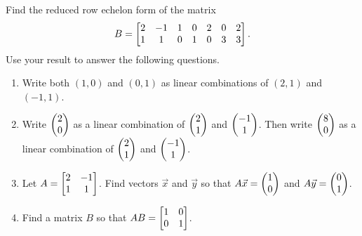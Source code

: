 \begin{problem}
Find the reduced row echelon form of the matrix
$$
B = 
\begin{bmatrix}
\nvec{2\\1}&
\nvec{-1\\1}&
\nvec{1\\0}&
\nvec{0\\1}&
\nvec{2\\0}&
\nvec{0\\3}&
\nvec{2\\3}
\end{bmatrix}.
$$
Use your result to answer the following questions.
\begin{enumerate}
 \item Write both $(1,0)$ and $(0,1)$ as linear combinations of $(2, 1)$ and $(-1,1)$. 
 \item Write  $\pvec{2\\0}$ as a linear combination of $\pvec{2\\1}$ and $\pvec{-1\\1}$.  Then write $\pvec{8\\0}$ as a linear combination of $\pvec{2\\1}$ and $\pvec{-1\\1}$. 
 \item Let $A = \begin{bmatrix}\nvec{2\\1}&\nvec{-1\\1}\end{bmatrix}$.  Find vectors $\vec x$ and $\vec y$ so that 
 $A\vec x = \pvec{1\\0}$ and $A\vec y = \pvec{0\\1}$.
 \item Find a matrix $B$ so that $AB = \begin{bmatrix}\nvec{1\\0}&\nvec{0\\1}\end{bmatrix}$. 
\end{enumerate}
 
\end{problem}

